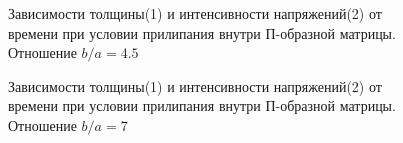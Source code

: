 		\begin{figure}[h!]	
				\def\svgwidth{\columnwidth}
				\caption{Зависимости толщины(1) и интенсивности напряжений(2) от времени при условии прилипания внутри П-образной матрицы. Отношение $b/a = 4.5$} 
				\label{vert_stick_4ba}
		\end{figure}
				\begin{figure}[h!]	
				\def\svgwidth{\columnwidth}
				\caption{Зависимости толщины(1) и интенсивности напряжений(2) от времени при условии прилипания внутри П-образной матрицы. Отношение $b/a = 7$ }
				\label{vert_stick_7ba}
		\end{figure}

